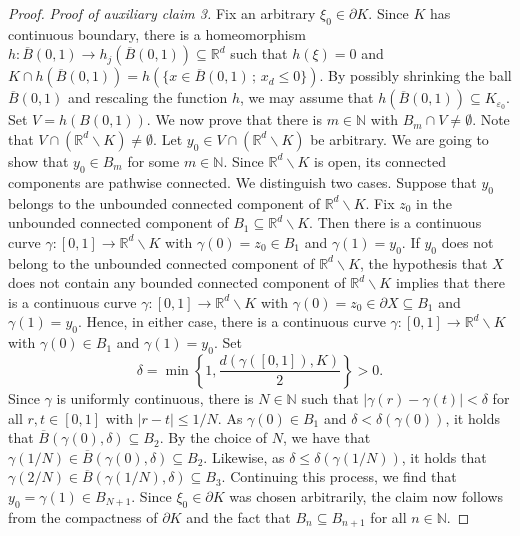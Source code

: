 \documentclass[12pt]{amsart}
\newcommand{\N}{\mathbb{N}}
\newcommand{\R}{\mathbb{R}}
\theoremstyle{definition}
\theoremstyle{remark}
\numberwithin{equation}{section}
\begin{document}
\begin{proof}
	\emph{Proof of auxiliary claim 3.} Fix an arbitrary $\xi_0\in\partial K$. Since $K$ has  continuous boundary, there is a homeomorphism $h:\overline{B}(0,1)\rightarrow h_j(\overline{B}(0,1)) \subseteq \R^d$ such that $h(\xi) = 0$ 
	and $K\cap h\left(\overline{B}(0,1)\right)=h\left(\{x\in \overline{B}(0,1)\, ; \,x_d\leq 0\}\right)$. By possibly shrinking the ball $\overline{B}(0,1)$ and rescaling the function $h$, we may assume that  $h\left(\overline{B}(0,1)\right)\subseteq K_{\varepsilon_0}$. Set $V=h\left(B(0,1)\right)$. We now prove that there is $m\in\N$ with  $B_m\cap V\neq\emptyset$. 
	Note that $V\cap\left(\R^d\backslash K\right) \neq \emptyset$.
	Let $y_0\in V\cap\left(\R^d\backslash K\right)$ be arbitrary. We are going to show that $y_0 \in B_m$ for some $m \in \N$. Since $\R^d\backslash K$ is open, its connected components are pathwise connected. We distinguish two cases. Suppose that $y_0$ belongs to the unbounded connected component of $\R^d\backslash K$. Fix $z_0$ in the unbounded connected component of $B_1\subseteq\R^d\backslash K$. Then there is a continuous curve $\gamma:[0,1]\rightarrow \R^d\backslash K$ with $\gamma(0)=z_0\in B_1$ and $\gamma(1)=y_0$. If $y_0$ does not belong to the unbounded connected component of $\R^d\backslash K$, the hypothesis that $X$ does not contain any bounded connected component of $\R^d\backslash K$ implies that there is a continuous curve $\gamma:[0,1]\rightarrow\R^d\backslash K$ with $\gamma(0)=z_0\in\partial X\subseteq B_1$ and $\gamma(1)=y_0$.
	Hence, in either case, there is a continuous curve $\gamma:[0,1]\rightarrow\R^d\backslash K$ with $\gamma(0)\in B_1$ and $\gamma(1)=y_0$. Set
	$$\delta=\min\left\{1,\frac{d(\gamma([0,1]),K)}{2}\right\}>0.$$
	Since $\gamma$ is uniformly continuous, there is $N \in \N$ such that $|\gamma(r)-\gamma(t)|<\delta$ for all  $r,t\in[0,1]$ with $|r-t|\leq 1/N$. As $\gamma(0)\in B_1$ and $\delta<\delta(\gamma(0))$, it holds that $ \overline{B}(\gamma(0),\delta)\subseteq B_2$. By the choice of $N$, we have that $\gamma(1/N)\in  \overline{B}(\gamma(0),\delta)\subseteq B_2$.  Likewise, as $\delta\leq\delta(\gamma(1/N))$, it holds that $\gamma(2/N)\in  \overline{B}(\gamma(1/N),\delta)\subseteq B_3$. Continuing this process,  we find that $y_0=\gamma(1)\in B_{N+1}$.  Since  $\xi_0\in\partial K$ was chosen arbitrarily, the claim now follows from the compactness of $\partial K$ and the fact that $B_n\subseteq B_{n+1}$ for all $n\in\N$.
	

\end{proof}
\end{document}
